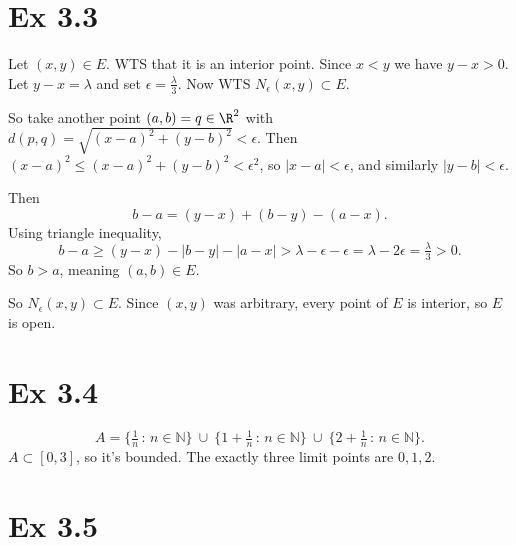 \documentclass{report}
\begin{document}
\section*{Ex 3.3}


\begin{proofWithHibiscus}
  Let $(x,y) \in E$. WTS that it is an interior point. 
  Since $x < y$ we have $y - x > 0$. Let $y - x = \lambda$ and set $\epsilon = \tfrac{\lambda}{3}$.  
  Now WTS $N_{\epsilon}(x,y) \subset E$.  

  So take another point $(a,b) = q \in \R^{2}$ with $d(p,q) = \sqrt{(x-a)^{2} + (y-b)^{2}} < \epsilon$.  
  Then $(x-a)^{2} \le (x-a)^{2} + (y-b)^{2} < \epsilon^{2}$, so $|x-a| < \epsilon$, and similarly $|y-b| < \epsilon$.  

  Then 
  \[
  b-a = (y-x) + (b-y) - (a-x).
  \]
  Using triangle inequality,
  \[
  b-a \ge (y-x) - |b-y| - |a-x| > \lambda - \epsilon - \epsilon = \lambda - 2\epsilon = \tfrac{\lambda}{3} > 0.
  \]
  So $b>a$, meaning $(a,b) \in E$.  

  So $N_{\epsilon}(x,y) \subset E$. Since $(x,y)$ was arbitrary, every point of $E$ is interior, so $E$ is open.     
\end{proofWithHibiscus}


\section*{Ex 3.4}


\begin{proofWithHibiscus}
  \[
  A=\Big\{\tfrac{1}{n}\,:\,n\in\mathbb{N}\Big\}\ \cup\ 
    \Big\{1+\tfrac{1}{n}\,:\,n\in\mathbb{N}\Big\}\ \cup\ 
    \Big\{2+\tfrac{1}{n}\,:\,n\in\mathbb{N}\Big\}.
  \]
  $A\subset[0,3]$, so it’s bounded. The exactly three limit points are $0,1,2$.
  \end{proofWithHibiscus}

\section*{Ex 3.5}
\end{document}
